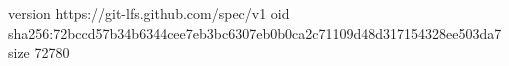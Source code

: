 version https://git-lfs.github.com/spec/v1
oid sha256:72bccd57b34b6344cee7eb3bc6307eb0b0ca2c71109d48d317154328ee503da7
size 72780
